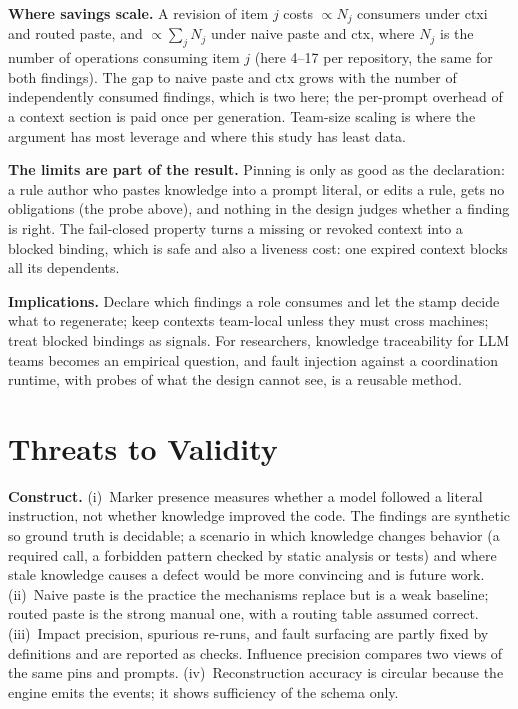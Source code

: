 \documentclass[10pt,conference]{IEEEtran}
\theoremstyle{definition}
\begin{document}
\textbf{Where savings scale.} A revision of item $j$ costs $\propto N_j$ consumers under ctxi and routed paste,
and $\propto\sum_j N_j$ under naive paste and ctx, where $N_j$ is the number of operations consuming item $j$
(here 4--17 per repository, the same for both findings). The gap to naive paste and ctx grows with the number of
independently consumed findings, which is two here; the per-prompt overhead of a context section is paid once per
generation. Team-size scaling is where the argument has most leverage and where this study has least data.

\textbf{The limits are part of the result.} Pinning is only as good as the declaration: a rule author who pastes
knowledge into a prompt literal, or edits a rule, gets no obligations (the probe above), and nothing in the
design judges whether a finding is right. The fail-closed property turns a missing or revoked context into a
blocked binding, which is safe and also a liveness cost: one expired context blocks all its dependents.

\textbf{Implications.} Declare which findings a role consumes and let the stamp decide what to regenerate; keep
contexts team-local unless they must cross machines; treat blocked bindings as signals. For researchers,
knowledge traceability for LLM teams becomes an empirical question, and fault injection against a coordination
runtime, with probes of what the design cannot see, is a reusable method.

\section{Threats to Validity}\label{sec:threats}

\textbf{Construct.} (i)~Marker presence measures whether a model followed a literal instruction, not whether
knowledge improved the code. The findings are synthetic so ground truth is decidable; a scenario in which
knowledge changes behavior (a required call, a forbidden pattern checked by static analysis or tests) and
where stale knowledge causes a defect would be more convincing and is future work. (ii)~Naive paste is the
practice the mechanisms replace but is a weak baseline; routed paste is the strong manual one, with a routing
table assumed correct. (iii)~Impact precision, spurious re-runs, and fault surfacing are partly fixed by
definitions and are reported as checks. Influence precision compares two views of the same pins and prompts.
(iv)~Reconstruction accuracy is circular because the engine emits the events; it shows sufficiency of the
schema only.
\end{document}

